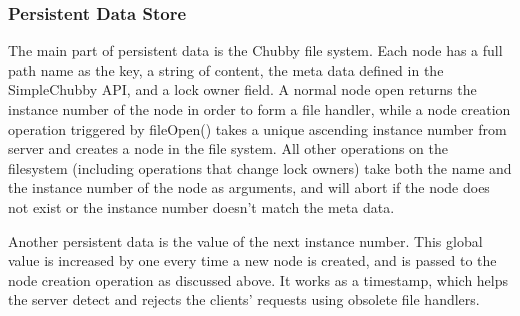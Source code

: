 \subsubsection{Persistent Data Store}

The main part of persistent data is the Chubby file system. Each node has
a full path name as the key, a string of content, the meta data defined
in the SimpleChubby API, and a lock owner field. A normal node open returns
the instance number of the node in order to form a file handler, while
a node creation operation triggered by fileOpen() takes a unique ascending
instance number from server and creates a node in the file system. All other
operations on the filesystem (including operations that change lock owners)
take both the name and the instance number of the node as arguments, and will
abort if the node does not exist or the instance number doesn't match the
meta data.

Another persistent data is the value of the next instance number. This global
value is increased by one every time a new node is created, and is passed
to the node creation operation as discussed above. It works as a timestamp,
which helps the server detect and rejects the clients' requests using obsolete
file handlers.
